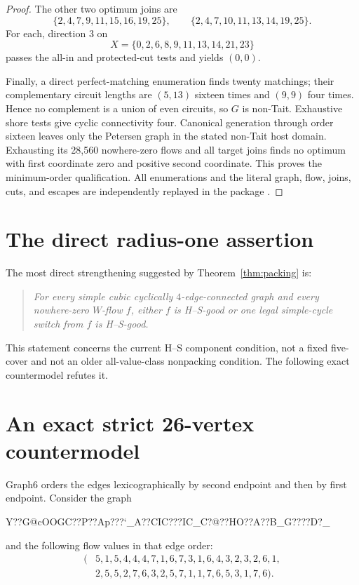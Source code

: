 \documentclass[11pt]{article}
\theoremstyle{definition}
\theoremstyle{remark}
\numberwithin{equation}{section}
\begin{document}
\begin{proof}
The other two optimum joins are
\[
 \{2,4,7,9,11,15,16,19,25\},\qquad
 \{2,4,7,10,11,13,14,19,25\}.
\]
For each, direction \(3\) on
\[
 X=\{0,2,6,8,9,11,13,14,21,23\}
\]
passes the all-in and protected-cut tests and yields \((0,0)\).

Finally, a direct perfect-matching enumeration finds twenty matchings;
their complementary circuit lengths are \((5,13)\) sixteen times and
\((9,9)\) four times.  Hence no complement is a union of even circuits,
so \(G\) is non-Tait.  Exhaustive shore tests give cyclic connectivity
four.  Canonical generation through order sixteen leaves only the
Petersen graph in the stated non-Tait host domain.  Exhausting its
28,560 nowhere-zero flows and all target joins finds no optimum with
first coordinate zero and positive second coordinate.  This proves the
minimum-order qualification.  All enumerations and the literal graph,
flow, joins, cuts, and escapes are independently replayed in the package
.
\end{proof}

\section{The direct radius-one assertion}

The most direct strengthening suggested by
Theorem~\ref{thm:packing} is:

\begin{quote}
\emph{For every simple cubic cyclically \(4\)-edge-connected graph and
every nowhere-zero \(W\)-flow \(f\), either \(f\) is H--S-good or one
legal simple-cycle switch from \(f\) is H--S-good.}
\end{quote}

This statement concerns the current H--S component condition, not a
fixed five-cover and not an older all-value-class nonpacking condition.
The following exact countermodel refutes it.

\section{An exact strict 26-vertex countermodel}

Graph6 orders the edges lexicographically by second endpoint and then by
first endpoint.  Consider the graph
\begin{center}
\ttfamily\small
Y??G@cOOGC??P??Ap???`\_A??CIC???IC\_C?@??HO??A??B\_G????D?\_
\end{center}
and the following flow values in that edge order:
\begin{equation}
\begin{split}
(&5,1,5,4,4,4,7,1,6,7,3,1,6,4,3,2,3,2,6,1,\\
 &2,5,5,2,7,6,3,2,5,7,1,1,7,6,5,3,1,7,6).
\end{split}
\label{eq:strict-flow}
\end{equation}
\end{document}
